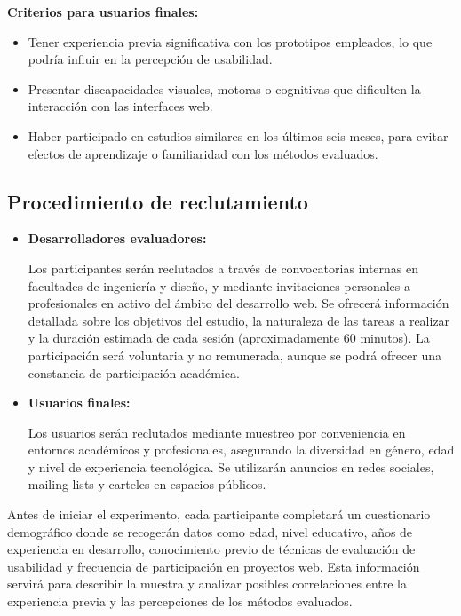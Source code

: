 \documentclass[a4paper,12pt]{report}
\begin{document}
\textbf{Criterios para usuarios finales:}
\begin{itemize}
    \item Tener experiencia previa significativa con los prototipos empleados, lo que podría influir en la percepción de usabilidad.
    \item Presentar discapacidades visuales, motoras o cognitivas que dificulten la interacción con las interfaces web.
    \item Haber participado en estudios similares en los últimos seis meses, para evitar efectos de aprendizaje o familiaridad con los métodos evaluados.
\end{itemize}

\subsection*{Procedimiento de reclutamiento}
\begin{itemize}
\item \textbf{Desarrolladores evaluadores:}

Los participantes serán reclutados a través de convocatorias internas en facultades de ingeniería y diseño, y mediante invitaciones personales a profesionales en activo del ámbito del desarrollo web. Se ofrecerá información detallada sobre los objetivos del estudio, la naturaleza de las tareas a realizar y la duración estimada de cada sesión (aproximadamente 60 minutos). La participación será voluntaria y no remunerada, aunque se podrá ofrecer una constancia de participación académica.

 \item \textbf{Usuarios finales:}

Los usuarios serán reclutados mediante muestreo por conveniencia en entornos académicos y profesionales, asegurando la diversidad en género, edad y nivel de experiencia tecnológica. Se utilizarán anuncios en redes sociales, mailing lists y carteles en espacios públicos.
\end{itemize}

Antes de iniciar el experimento, cada participante completará un cuestionario demográfico donde se recogerán datos como edad, nivel educativo, años de experiencia en desarrollo, conocimiento previo de técnicas de evaluación de usabilidad y frecuencia de participación en proyectos web. Esta información servirá para describir la muestra y analizar posibles correlaciones entre la experiencia previa y las percepciones de los métodos evaluados.
\end{document}
